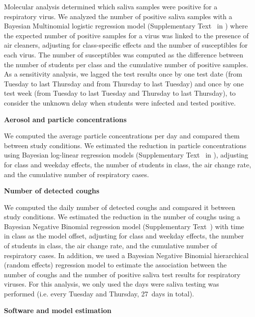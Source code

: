 \documentclass[fleqn,11pt]{wlscirep}
\begin{document}
\noindent Molecular analysis determined which saliva samples were positive for a respiratory virus. We analyzed the number of positive saliva samples with a Bayesian Multinomial logistic regression model (Supplementary Text~ in \supp) where the expected number of positive samples for a virus was linked to the presence of air cleaners, adjusting for class-specific effects and the number of susceptibles for each virus. The number of susceptibles was computed as the difference between the number of students per class and the cumulative number of positive samples. As a sensitivity analysis, we lagged the test results once by one test date (\ie from Tuesday to last Thursday and from Thursday to last Tuesday) and once by one test week (\ie from Tuesday to last Tuesday and Thursday to last Thursday), to consider the unknown delay when students were infected and tested positive. \medskip

\noindent\textbf{Aerosol and particle concentrations} \smallskip

\noindent We computed the average particle concentrations per day and compared them between study conditions. We estimated the reduction in particle concentrations using Bayesian log-linear regression models (Supplementary Text~ in \supp), adjusting for class and weekday effects, the number of students in class, the air change rate, and the cumulative number of respiratory cases. \medskip

\noindent\textbf{Number of detected coughs} \smallskip

\noindent We computed the daily number of detected coughs and compared it between study conditions. We estimated the reduction in the number of coughs using a Bayesian Negative Binomial regression model (Supplementary Text~) with time in class as the model offset, adjusting for class and weekday effects, the number of students in class, the air change rate, and the cumulative number of respiratory cases. In addition, we used a Bayesian Negative Binomial hierarchical (random effects) regression model to estimate the association between the number of coughs and the number of positive saliva test results for respiratory viruses. For this analysis, we only used the days were saliva testing was performed (i.e. every Tuesday and Thursday, 27~days in total).  \medskip


\noindent\textbf{Software and model estimation} \smallskip
\end{document}

